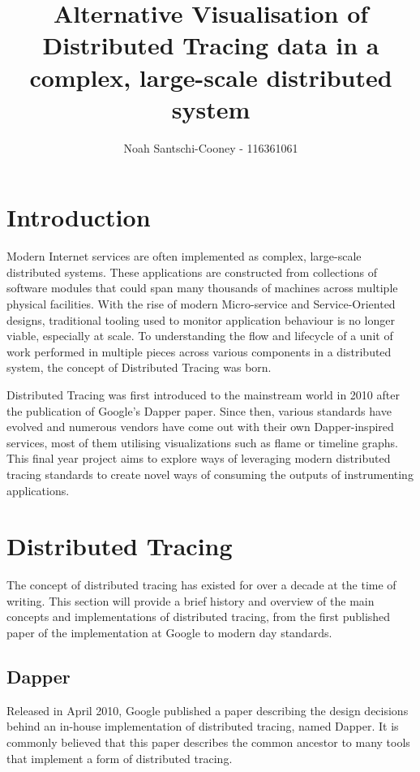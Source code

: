 \documentclass[pdftex,titlepage]{article}
\author{Noah Santschi-Cooney - 116361061}
\title{Alternative Visualisation of Distributed Tracing data in a complex, large-scale distributed system}
\begin{document}
    \maketitle
    \section{Introduction}

    Modern Internet services are often implemented as complex, large-scale distributed systems. 
    These applications are constructed from collections of software modules that could span many
    thousands of machines across multiple physical facilities. With the rise of modern 
    Micro-service and Service-Oriented designs, traditional tooling used to monitor application 
    behaviour is no longer viable, especially at scale. To understanding the flow and lifecycle 
    of a unit of work performed in multiple pieces across various components in a distributed system, 
    the concept of Distributed Tracing was born. 
    
    Distributed Tracing was first introduced to the mainstream world in 2010 after the publication
    of Google’s Dapper paper. Since then, various standards have evolved and numerous vendors have
    come out with their own Dapper-inspired services, most of them utilising visualizations such as
    flame or timeline graphs. This final year project aims to explore ways of leveraging modern 
    distributed tracing standards to create novel ways of consuming the outputs of instrumenting applications.

    \section{Distributed Tracing}
    The concept of distributed tracing has existed for over a decade at the time of writing. 
    This section will provide a brief history and overview of the main concepts and implementations of distributed tracing,
    from the first published paper of the implementation at Google to modern day standards.

        \subsection{Dapper}
        Released in April 2010,
        Google published a paper describing the design decisions behind an in-house implementation of distributed tracing,
        named Dapper. It is commonly believed that this paper describes the common ancestor to many tools that implement
        a form of distributed tracing.
\end{document}
